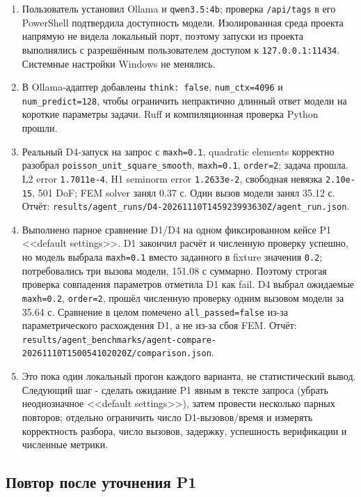 \documentclass[11pt,a4paper]{article}
\begin{document}
\begin{enumerate}
    \item Пользователь установил Ollama и \texttt{qwen3.5:4b}; проверка \texttt{/api/tags} в его PowerShell подтвердила доступность модели. Изолированная среда проекта напрямую не видела локальный порт, поэтому запуски из проекта выполнялись с разрешённым пользователем доступом к \texttt{127.0.0.1:11434}. Системные настройки Windows не менялись.
    \item В Ollama-адаптер добавлены \texttt{think: false}, \texttt{num\_ctx=4096} и \texttt{num\_predict=128}, чтобы ограничить непрактично длинный ответ модели на короткие параметры задачи. Ruff и компиляционная проверка Python прошли.
    \item Реальный D4-запуск на запрос с \texttt{maxh=0.1}, quadratic elements корректно разобрал \texttt{poisson\_unit\_square\_smooth}, \texttt{maxh=0.1}, \texttt{order=2}; задача прошла. L2 error \texttt{1.7011e-4}, H1 seminorm error \texttt{1.2633e-2}, свободная невязка \texttt{2.10e-15}, 501 DoF; FEM solver занял 0.37 с. Один вызов модели занял 35.12 с. Отчёт: \texttt{results/agent\_runs/D4-20261110T145923993630Z/agent\_run.json}.
    \item Выполнено парное сравнение D1/D4 на одном фиксированном кейсе P1 <<default settings>>. D1 закончил расчёт и численную проверку успешно, но модель выбрала \texttt{maxh=0.1} вместо заданного в fixture значения \texttt{0.2}; потребовались три вызова модели, 151.08 с суммарно. Поэтому строгая проверка совпадения параметров отметила D1 как fail. D4 выбрал ожидаемые \texttt{maxh=0.2}, \texttt{order=2}, прошёл численную проверку одним вызовом модели за 35.64 с. Сравнение в целом помечено \texttt{all\_passed=false} из-за параметрического расхождения D1, а не из-за сбоя FEM. Отчёт: \texttt{results/agent\_benchmarks/agent-compare-20261110T150054102020Z/comparison.json}.
    \item Это пока один локальный прогон каждого варианта, не статистический вывод. Следующий шаг - сделать ожидание P1 явным в тексте запроса (убрать неоднозначное <<default settings>>), затем провести несколько парных повторов; отдельно ограничить число D1-вызовов/время и измерять корректность разбора, число вызовов, задержку, успешность верификации и численные метрики.
\end{enumerate}

\subsection{Повтор после уточнения P1}
\end{document}
